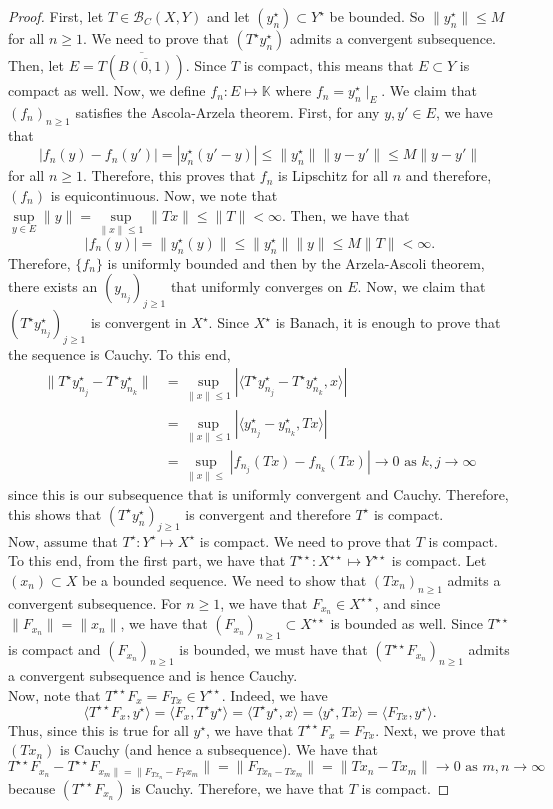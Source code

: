 \documentclass[12pt]{article}
\def\K{\mathbb{K}}
\newcommand{\B}{\mathscr{B}}
\newcommand{\la}{\langle}
\newcommand{\ra}{\rangle}
\newcommand{\sbs}{\subset}
\newcommand{\Xs}{X^{\star}}
\newcommand{\Xss}{X^{\star \star}}
\newcommand{\Ts}{T^{\star}}
\newcommand{\Tss}{T^{\star \star}}
\newcommand{\Ys}{Y^{\star}}
\newcommand{\Yss}{Y^{\star \star}}
\newcommand{\ys}{y^{\star}}
\begin{document}
\vspace{-25pt}
\begin{proof}
First, let $T \in \B_C(X, Y)$ and let $(\ys_n) \sbs \Ys$ be bounded. So $\| \ys_n \| \leq M$ for all $n \geq 1$. We need to prove that $(\Ts \ys_n)$ admits a convergent subsequence. Then, let $E = \overline{T(\overline{B(0, 1)})}$. Since $T$ is compact, this means that $E \sbs Y$ is compact as well. Now, we define $f_n: E \mapsto \K$ where $f_n = \ys_n \mid_{E}$. We claim that $(f_n)_{n \geq 1}$ satisfies the Ascola-Arzela theorem. First, for any $y, y' \in E$, we have that 
\[ | f_n(y) - f_n(y') | = |\ys_n(y' - y)| \leq \| \ys_n\| \| y - y' \| \leq M \| y- y'\| \]
for all $n \geq 1$. Therefore, this proves that $f_n $ is Lipschitz for all $n$ and therefore, $(f_n)$ is equicontinuous. Now, we note that $\sup\limits_{y \in E} \| y \| = \sup\limits_{\| x \| \leq 1} \| Tx \| \leq \| T \| < \infty$. Then, we have that 
\[ |f_n(y) | = \| \ys_n(y) \| \leq \| \ys_n \| \| y \| \leq M \| T \| < \infty.\]
Therefore, $\{ f_n \}$ is uniformly bounded and then by the Arzela-Ascoli theorem, there exists an $(y_{n_j})_{j \geq 1}$ that uniformly converges on $E$. Now, we claim that $(\Ts \ys_{n_j})_{j \geq 1}$ is convergent in $\Xs$. Since $\Xs$ is Banach, it is enough  to prove that the sequence is Cauchy. To this end, 
\begin{align*}
\| \Ts \ys_{n_j} - \Ts \ys_{n_k} \| &= \sup\limits_{\| x \| \leq 1} | \la \Ts \ys_{n_j} - \Ts \ys_{n_k}, x \ra | \\ 
& = \sup\limits_{\| x \| \leq 1} | \la \ys_{n_j} - \ys_{n_k}, Tx \ra | \\
& = \sup\limits_{\| x \| \leq } | f_{n_j}(Tx) - f_{n_k}(Tx) | \to 0 \text{ as } k, j \to \infty
\end{align*}
since this is our subsequence that is uniformly convergent and Cauchy. Therefore, this shows that $(\Ts \ys_n)_{j \geq 1}$ is convergent and therefore $\Ts$ is compact. \\
\indent Now, assume that $\Ts: \Ys \mapsto \Xs$ is compact. We need to prove that $T$ is compact. To this end, from the first part, we have that $T^{\star \star}: \Xss \mapsto Y^{\star \star}$ is compact. Let $(x_n) \sbs X$ be a bounded sequence. We need to show that $(T x_n)_{n\geq 1}$ admits a convergent subsequence. For $n \geq 1$, we have that $F_{x_n} \in \Xss$, and since $\| F_{x_n} \| = \| x_n \|$, we have that $(F_{x_n})_{n \geq 1} \sbs \Xss$ is bounded as well. Since $\Tss$ is compact and $(F_{x_n})_{n \geq 1}$ is bounded, we must have that $\left( \Tss F_{x_n}\right)_{n \geq 1}$ admits a convergent subsequence and is hence Cauchy. \\
\indent Now, note that $\Tss F_x = F_{Tx} \in \Yss$. Indeed, we have 
\[ \la \Tss F_x, \ys \ra = \la F_x, \Ts \ys \ra = \la \Ts \ys, x \ra = \la \ys, Tx \ra = \la F_{Tx}, \ys \ra.\]
Thus, since this is true for all $\ys$, we have that $\Tss F_x = F_{Tx}$. Next, we prove that $(T x_n)$ is Cauchy (and hence a subsequence). We have that 
\[ \Tss F_{x_n} - \Tss F_{x_m \| = \| F_{Tx_n} - F_T x_m} \| = \| F_{Tx_n - T x_m} \| = \| T x_n - T x_m \| \to 0 \text{ as } m,n \to \infty \]
because $(\Tss F_{x_n})$ is Cauchy. Therefore, we have that $T$ is compact. 
\end{proof}
\end{document}
